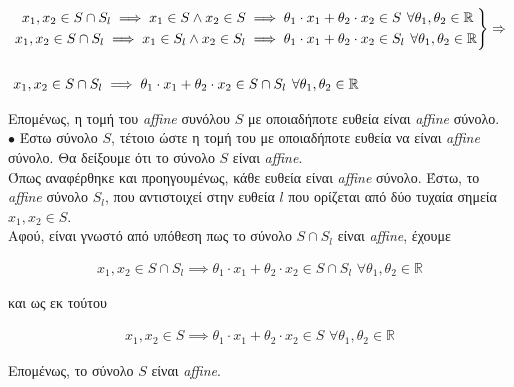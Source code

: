 \documentclass[12pt]{article}
\newcommand{\R}{\mathbb{R}}
\newcommand{\margin}{\hspace{4pt}}
\newenvironment{rcases}
    {\left.\begin{aligned}}
    {\end{aligned}\right\rbrace}
\begin{document}
\begin{align*}
    &\begin{rcases}
        x_1, x_2 \in S \cap S_l \implies x_1 \in S \wedge x_2 \in S & \implies \theta_1 \cdot x_1 + \theta_2 \cdot x_2 \in S \margin \forall \theta_1, \theta_2 \in \R\\
        x_1, x_2 \in S \cap S_l \implies x_1 \in S_l \wedge x_2 \in S_l & \implies \theta_1 \cdot x_1 + \theta_2 \cdot x_2 \in S_l \margin \forall \theta_1, \theta_2 \in \R
    \end{rcases}
    \Rightarrow \\ \\
    &x_1, x_2 \in S \cap S_l \implies \theta_1 \cdot x_1 + \theta_2 \cdot x_2 \in S \cap S_l \margin \forall \theta_1, \theta_2 \in \R
\end{align*}

Επομένως, η τομή του \textit{affine} συνόλου $S$ με οποιαδήποτε ευθεία είναι \textit{affine} σύνολο.\\

$\bullet$ Έστω σύνολο $S$, τέτοιο ώστε η τομή του με οποιαδήποτε ευθεία να είναι \textit{affine} σύνολο.
Θα δείξουμε ότι το σύνολο $S$ είναι \textit{affine}.\\

Όπως αναφέρθηκε και προηγουμένως, κάθε ευθεία είναι \textit{affine} σύνολο.
Έστω, το \textit{affine} σύνολο $S_l$, που αντιστοιχεί στην ευθεία $l$
που ορίζεται από δύο τυχαία σημεία $x_1, x_2 \in S$.\\

Αφού, είναι γνωστό από υπόθεση πως το σύνολο $S \cap S_l$ είναι \textit{affine}, έχουμε

\begin{align*}
    x_1, x_2 \in S \cap S_l \implies  \theta_1 \cdot x_1 + \theta_2 \cdot x_2 \in S \cap S_l \margin \forall \theta_1, \theta_2 \in \R
\end{align*}

και ως εκ τούτου

\begin{align*}
    x_1, x_2 \in S \implies  \theta_1 \cdot x_1 + \theta_2 \cdot x_2 \in S \margin \forall \theta_1, \theta_2 \in \R
\end{align*}

Επομένως, το σύνολο $S$ είναι \textit{affine}.

\vspace{2in} %

\pagebreak
\end{document}
